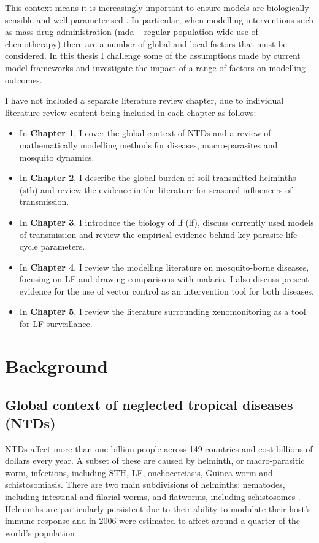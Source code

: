 This context means it is increasingly important to ensure models are biologically sensible and well parameterised \cite{Davis2019}. In particular, when modelling interventions such as mass drug administration (\acrshort{mda} -- regular population-wide use of chemotherapy) there are a number of global and local factors that must be considered. In this thesis I challenge some of the assumptions made by current model frameworks and investigate the impact of a range of factors on modelling outcomes.

I have not included a separate literature review chapter, due to individual literature review content being included in each chapter as follows:

\begin{itemize}
    \item In \textbf{Chapter 1}, I cover the global context of NTDs and a review of mathematically modelling methods for diseases, macro-parasites and mosquito dynamics.
    \item In \textbf{Chapter 2}, I describe the global burden of soil-transmitted helminths (\acrshort{sth}) and review the evidence in the literature for seasonal influencers of transmission. 
    \item In \textbf{Chapter 3}, I introduce the biology of \acrlong{lf} (\acrshort{lf}), discuss currently used models of transmission and review the empirical evidence behind key parasite life-cycle parameters. 
    \item In \textbf{Chapter 4}, I review the modelling literature on mosquito-borne diseases, focusing on LF and drawing comparisons with malaria. I also discuss present evidence for the use of vector control as an intervention tool for both diseases.
    \item In \textbf{Chapter 5}, I review the literature surrounding xenomonitoring as a tool for LF surveillance.
\end{itemize}

\section{Background}

\subsection{Global context of neglected tropical diseases (NTDs)}

NTDs affect more than one billion people across 149 countries \cite{WHO_NTD} and cost billions of dollars every year. A subset of these are caused by helminth, or macro-parasitic worm, infections, including STH, LF, onchocerciasis, Guinea worm and schistosomiasis. There are two main subdivisions of helminths: nematodes, including intestinal and filarial worms, and flatworms, including schistosomes \cite{Hotez2008}. Helminths are particularly persistent due to their ability to modulate their host's immune response \cite{Maizels2018} and in 2006 were estimated to affect around a quarter of the world's population \cite{Bethony2006}.

